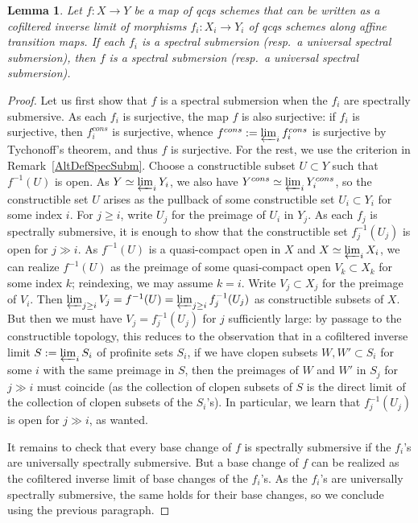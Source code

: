 \documentclass[reqno]{amsart}
\newtheorem{lemma}[theorem]{Lemma}
\theoremstyle{definition}
\begin{document}
\begin{lemma}
\label{UnivSpecSubmLimit}
Let $f\colon X \to Y$ be a map of qcqs schemes that can be written as a cofiltered
inverse limit of morphisms $f_i\colon X_i \to Y_i$ of qcqs schemes along affine
transition maps. If each $f_i$ is a spectral submersion (resp.~a universal
spectral submersion), then  $f$ is a spectral submersion (resp.~a universal
spectral submersion).
\end{lemma}
\begin{proof}
Let us first show that $f$ is a spectral submersion when the $f_i$ are
spectrally submersive. As each $f_i$ is surjective, the map $f$ is also
surjective: if $f_i$ is surjective, then $f_i^{cons}$ is surjective, whence
$f^{cons} := \varprojlim_i f_i^{cons}$ is surjective by Tychonoff's theorem,
and thus $f$ is surjective. For the rest, we use the criterion in
Remark~\ref{AltDefSpecSubm}. Choose a constructible subset $U \subset Y$ such
that $f^{-1}(U)$ is open. As $Y \simeq \varprojlim_i Y_i$, we also have
$Y^{cons} \simeq \varprojlim_i Y_i^{cons}$, so the constructible set $U$ arises
as the pullback of some constructible set $U_i \subset Y_i$ for some index $i$.
For $j \geq i$, write $U_j$ for the preimage of $U_i$ in $Y_j$. As each $f_j$
is spectrally submersive, it is enough to show that the constructible set
$f_j^{-1}(U_j)$ is open for $j \gg i$. As $f^{-1}(U)$ is a quasi-compact open in
$X$ and $X \simeq \varprojlim_i X_i$, we can realize $f^{-1}(U)$ as the preimage of some quasi-compact open $V_k \subset X_k$ for some index $k$; reindexing, we may assume $k = i$. Write $V_j \subset X_j$ for the preimage of $V_i$. Then $\varprojlim_{j \geq i} V_j = f^{-1}(U) = \varprojlim_{j \geq i} f_j^{-1}(U_j)$ as constructible subsets of $X$.  But then we must have $V_j = f_j^{-1}(U_j)$ for $j$ sufficiently large: by passage to the constructible topology, this reduces to the observation that in a cofiltered inverse limit $S := \varprojlim_i S_i$ of profinite sets $S_i$, if we have clopen subsets $W, W' \subset S_i$ for some $i$ with the same preimage in $S$, then the preimages of $W$ and $W'$ in $S_j$ for $j \gg i$ must coincide (as the collection of clopen subsets of $S$ is the direct limit of the collection of clopen subsets of the $S_i$'s). In particular, we learn that $f_j^{-1}(U_j)$ is open for $j \gg i$, as wanted.

It remains to check that every base change of $f$ is spectrally submersive if the $f_i$'s are universally spectrally submersive. But a base change of $f$ can be realized as the cofiltered inverse limit of base changes of the $f_i$'s. As the $f_i$'s are universally spectrally submersive, the same holds for their base changes, so we conclude using the previous paragraph. 
\end{proof}
\end{document}

